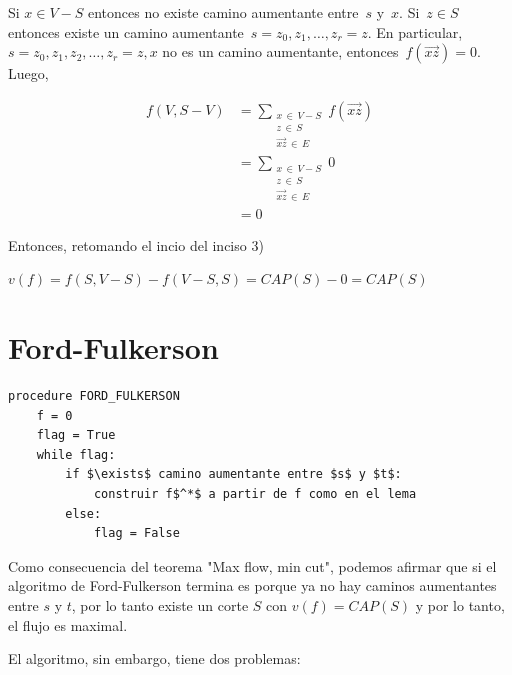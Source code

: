 \documentclass[10pt,a4paper]{article}
\begin{document}
Si $x\in V - S$ entonces no existe camino aumentante entre $s$ y $x$. Si $z\in S$ entonces existe un camino aumentante $s=z_0, z_1, \dots, z_r=z$. En particular, $s=z_0, z_1, z_2,\dots, z_r=z, x$ no es un camino aumentante, entonces $f(\overrightarrow{xz}) = 0$. Luego,

\begin{center}
\begin{align*} f(V, S-V) &= \sum\limits_{\substack{x\,\in\,V -S\\ z \,\in\,S\\ \overrightarrow{xz} \,\in\,E}}f(\overrightarrow{xz})\\ &= \sum\limits_{\substack{x\,\in\,V -S\\ z \,\in\,S\\ \overrightarrow{xz} \,\in\,E}}0\\ &= 0 \end{align*}
\end{center}

Entonces, retomando el incio del inciso 3)

\begin{center}
$v(f) = f(S, V- S)-f(V-S, S) = CAP(S) - 0 = CAP(S)$
\end{center}

\section*{Ford-Fulkerson}


    \begin{lstlisting}[language=pseudo]
procedure FORD_FULKERSON
    f = 0
    flag = True
    while flag:
        if $\exists$ camino aumentante entre $s$ y $t$:
            construir f$^*$ a partir de f como en el lema
        else:
            flag = False
\end{lstlisting}


Como consecuencia del teorema "Max flow, min cut", podemos afirmar que si el algoritmo de Ford-Fulkerson termina es porque ya no hay caminos aumentantes entre $s$ y $t$, por lo tanto existe un corte $S$ con $v(f) = CAP(S)$ y por lo tanto, el flujo es maximal.

El algoritmo, sin embargo, tiene dos problemas:
\end{document}
